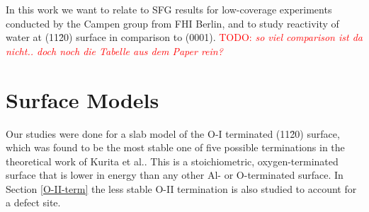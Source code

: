 \documentclass[11pt,DIV=13,BCOR=5mm,a4paper,headinclude]{scrbook}
\newcommand\todo[1]{\textcolor{red}{TODO: \textit{{#1}}}}
\begin{document}
In this work we want to relate to SFG results for low-coverage experiments conducted by the Campen group from FHI Berlin, and to study reactivity of water at (11\=20) surface in comparison to (0001).
\todo{so viel comparison ist da nicht.. doch noch die Tabelle aus dem Paper rein?}
\section{Surface Models}
Our studies were done for a slab model of the O-I terminated (11\=20) surface, which was found to be the most stable one of five possible terminations in the theoretical work of Kurita et al.\cite{kuri10}.
This is a stoichiometric, oxygen-terminated surface that is lower in energy than any other Al- or O-terminated surface.
In Section \ref{O-II-term} the less stable O-II termination is also studied to account for a defect site.
\end{document}
